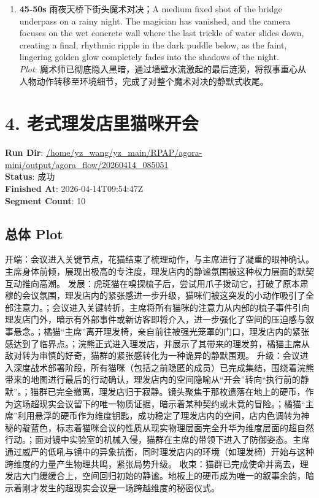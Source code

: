 \documentclass[11pt,a4paper]{article}
\begin{document}
\begin{enumerate}
\item \textbf{45-50s} 雨夜天桥下街头魔术对决；A medium fixed shot of the bridge underpass on a rainy night. The magician has vanished, and the camera focuses on the wet concrete wall where the last trickle of water slides down, creating a final, rhythmic ripple in the dark puddle below, as the faint, lingering golden glow completely fades into the shadows of the night.\\\newline \textit{Plot}: 魔术师已彻底隐入黑暗，通过墙壁水流激起的最后涟漪，将叙事重心从人物动作转移至环境细节，完成了对整个魔术对决的静默式收尾。
\end{enumerate}

\section{4. 老式理发店里猫咪开会}
\textbf{Run Dir}: \url{/home/yz\_wang/yz\_main/RPAP/agora-mini/output/agora\_flow/20260414\_085051}\\
\textbf{Status}: 成功\\
\textbf{Finished At}: 2026-04-14T09:54:47Z\\
\textbf{Segment Count}: 10

\subsection*{总体 Plot}
开端：会议进入关键节点，花猫结束了梳理动作，与主席进行了凝重的眼神确认。主席身体前倾，展现出极高的专注度，理发店内的静谧氛围被这种权力层面的默契互动推向高潮。 发展：虎斑猫在嗅探梳子后，尝试用爪子拨动它，打破了原本肃穆的会议氛围，理发店内的紧张感进一步升级，猫咪们被这突发的小动作吸引了全部注意力。；会议进入关键转折，主席将所有猫咪的注意力从内部的梳子事件引向理发店门外，暗示有外部事件或新访客即将介入，进一步强化了空间的压迫感与叙事悬念。；橘猫“主席”离开理发椅，亲自前往被强光笼罩的门口，理发店内的紧张感达到了临界点。；浣熊正式进入理发店，并展示了其带来的理发剪，橘猫主席从敌对转为审慎的好奇，猫群的紧张感转化为一种诡异的静默围观。 升级：会议进入深度战术部署阶段，所有猫咪（包括之前隐匿的成员）已完成集结，围绕着浣熊带来的地图进行最后的行动确认，理发店内的空间隐喻从“开会”转向“执行前的静默”。；猫群已完全撤离，理发店归于寂静。镜头聚焦于那枚遗落在地上的硬币，作为这场超现实会议留下的唯一物质证据，暗示着某种契约或未竟的冒险。；橘猫“主席”利用悬浮的硬币作为维度钥匙，成功稳定了理发店内的空间，店内色调转为神秘的靛蓝色，标志着猫咪会议的性质从现实物理层面完全升华为维度层面的超自然行动。；面对镜中实验室的机械入侵，猫群在主席的带领下进入了防御姿态。主席通过威严的低吼与镜中的异象抗衡，同时理发店内的环境（如理发椅）开始与这种跨维度的力量产生物理共鸣，紧张局势升级。 收束：猫群已完成使命并离去，理发店大门缓缓合上，空间回归初始的静谧。地板上的硬币成为唯一的叙事余韵，暗示着刚才发生的超现实会议是一场跨越维度的秘密仪式。
\end{document}
